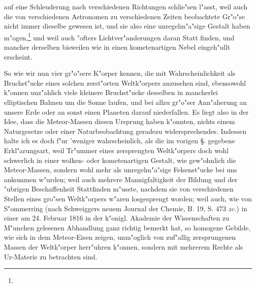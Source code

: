 \documentclass[a4paper, 11pt, oneside, polutonikogreek, german]{article}
\begin{document}
auf eine Schleuderung nach verschiedenen Richtungen schlie"sen l"asst, weil auch die von verschiedenen Astronomen zu verschiedenen Zeiten beobachtete Gr"o"se nicht immer dieselbe gewesen ist, und sie also eine unregelm"a"sige Gestalt haben m"ogen,\footnote{} und weil auch "ofters Lichtver"anderungen daran Statt finden, und mancher derselben bisweilen wie in einen kometenartigen Nebel eingeh"ullt erscheint. 

So wie wir nun vier gr"o"sere K"orper kennen, die mit Wahrscheinlichkeit als Bruchst"ucke eines solchen zerst"orten Weltk"orpers anzusehen sind, ebensowohl k"onnen unz"ahlich viele kleinere Bruchst"ucke desselben in mancherlei elliptischen Bahnen um die Sonne laufen, und bei allzu gr"o"ser Ann"aherung an unsere Erde oder an sonst einen Planeten darauf niederfallen. Es liegt also in der Idee, dass die Meteor-Massen diesen Ursprung haben k"onnten, nichts einem Naturgesetze oder einer Naturbeobachtung geradezu widersprechendes. Indessen halte ich es doch f"ur 'weniger wahrscheinlich, als die im vorigen §. gegebene Erkl"arungsart, weil Tr"ummer eines zersprengten Weltk"orpers doch wohl schwerlich in einer wolken- oder kometenartigen Gestalt, wie gew"ohnlich die Meteor-Massen, sondern wohl mehr als unregelm"a"sige Felsenst"ucke bei uns ankommen w"urden; weil auch mehrere Mannigfaltigkeit der Bildung und der "ubrigen Beschaffenheit Stattfinden m"usste, nachdem sie von verschiedenen Stellen eines gro"sen Weltk"orpers w"aren losgesprengt worden; weil auch, wie von S"ommerring (nach Schweiggers neuem Journal der Chemie, B. 19, S. 473 \emph{zc.}) in einer am 24. Februar 1816 in der k"onigl. Akademie der Wissenschaften zu M"unchen gelesenen Abhandlung ganz richtig bemerkt hat, so homogene Gebilde, wie sich in dem Meteor-Eisen zeigen, unm"oglich von zuf"allig zersprungenen Massen der Weltk"orper herr"uhren k"onnen, sondern mit mehrerem Rechte als Ur-Materie zu betrachten sind.
\end{document}
